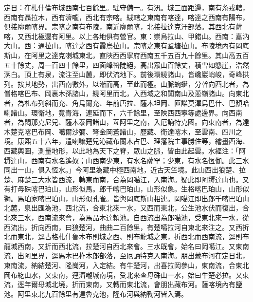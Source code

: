 \begin{pinyinscope}
定日：在札什倫布城西南七百餘里。駐守備一。有汛。城三面距邊，南有糸戎轄，西南有聶拉木，西有濟嚨，西北有宗喀。絨轄之東南有喀達，喀達之西南有陽布，俱接廓爾喀界。宗喀之南有布陵，南近廓爾喀，北接拉達克汗部落。其西北有薩喀，又西北極邊有阿里。以上各地俱有營官。東：崇烏拉山、甲錯山。西南：嘉汭大山。西：通拉山。喀達之西有霞烏拉山。宗喀之東有鞏塘拉山。布陵境內有岡底斯山，在阿里之達克喇城東北，直陜西西寧府西南五千五百九十餘里。其山高五百五十餘丈，周一百四十餘里，四面峰巒陡絕，高出眾山百餘丈，積雪如懸崖，浩然潔白。頂上有泉，流注至山麓，即伏流地下。前後環繞諸山，皆巉巖峭峻，奇峰拱列。按其地勢，出西南徼外，以漸而高，至此而極。山脈蜿蜒，分幹向西北者，為僧格喀巴布、岡裏木孫諸山，繞阿里而北，入西域之和闐南山及蔥嶺諸山。向東北者，為札布列斜而充、角烏爾充、年前唐拉、薩木坦岡、匝諾莫渾烏巴什、巴顏哈喇諸山。環衛地，竟青海，連延而下，六千餘里，至陜西西寧等處邊界。向西南者，為悶那克尼兒、薩木泰岡諸山，亙阿里之南，入厄訥特克國。向東南者，為達木楚克喀巴布岡、噶爾沙彌、弩金岡蒼諸山，歷藏、衛達喀木，至雲南、四川之境。康熙五十六年，遣喇嘛楚兒沁藏布蘭木占巴、理籓院主事勝住等，繪畫西海、西藏輿圖，測量地形，以此地為天下之脊，眾山之脈，皆由此起雲。水經注：「阿耨達山，西南有水名遙奴；山西南少東，有水名薩罕；少東，有水名恆伽。此三水同出一山，俱入恆水。」今阿里為藏中極西南地，近古天竺境。此山西出狼楚、拉楚、麻楚三大水皆西流，轉東而南，合為岡噶江，入南海。疑此即阿耨達山也。又有打母硃喀巴珀山，山形似馬。郎千喀巴珀山，山形似象。生格喀巴珀山，山形似獅。馬珀家喀巴珀山，山形似孔雀。皆與岡底斯山相連。岡噶江即出郎千喀巴珀山北麓，泉出匯為池，西北流，合東北來一水，又西而東北，公生池水伏而復出，合北來三水，西南流來會，為馬品木達賴池。自西流出為郎噶池，受東北來一水，從西流出，折向西南，曰狼楚河，曲曲二百餘里，有楚噶拉河自東北來注之。又西折北而東北，逕古格札什魯木布則城之西、則布龍城之東，折西北而西南流，逕則布龍城西南，又折而西北流，拉楚河自西北來會。三水既會，始名曰岡噶江。又東南流，出阿里界，逕馬木巴柞木郎部落，至厄訥特克入南海。朋出藏布河在定日北，東南流，納結楚河、隆崗河，入定結。有牛楚河，出喜拉岡參山，東南流，合東北岡布紇山水，又東南，逕濟嚨城南境，受北來查母硃山一水，始曰牛楚必拉。又東流，逕年爾母城北境，折而東南，又轉而東北流，會朋出藏布河。薩喀境內有鹽池。阿里東北九百餘里有達魯克池，隆布河與納鞠河皆入焉。


\end{pinyinscope}